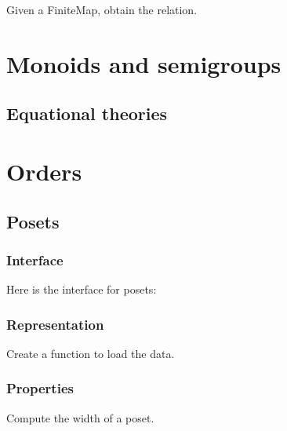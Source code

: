 \begin{gradedexercise}
Given a FiniteMap, obtain the relation.


%

\end{gradedexercise}


\chapter{Monoids and semigroups}


\section{Equational theories}



\chapter{Orders}


\section{Posets}

\subsection*{Interface}

Here is the interface for posets:

%

\subsection*{Representation}


\begin{gradedexercise}[Representation]
Create a function to load the data.


%

\end{gradedexercise}

\subsection{Properties}


\begin{gradedexercise}
Compute the width of a poset.
\end{gradedexercise}

